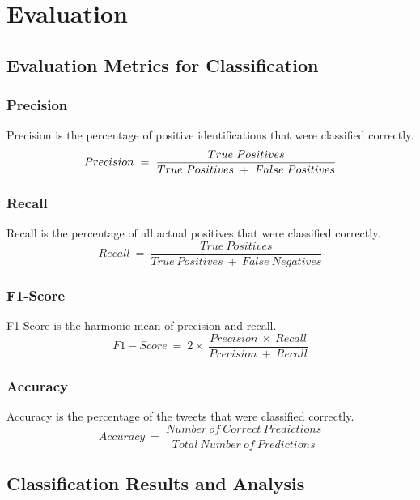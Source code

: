 \section{Evaluation}

\subsection{Evaluation Metrics for Classification}

\subsubsection{Precision}
Precision is the percentage of positive identifications that were classified correctly.\newline
\begin{equation}
\small
    Precision\ =\ \frac{True\ Positives}{True\ Positives\ +\ False\ Positives}
\end{equation}
\normalsize
\subsubsection{Recall}
Recall is the percentage of all actual positives that were classified correctly.
\small
\begin{equation}
    Recall\ =\ \frac{True\ Positives}{True\ Positives\ +\ False\ Negatives}
\end{equation}
\normalsize
\subsubsection{F1-Score}
F1-Score is the harmonic mean of precision and recall.
\small
\begin{equation}
    F1-Score\ =\ 2 \times\ \frac{Precision\ \times\ Recall}{Precision\ +\ Recall}
\end{equation}
\normalsize
\subsubsection{Accuracy}
Accuracy is the percentage of the tweets that were classified correctly.
\small
\begin{equation}
    Accuracy\ =\ \frac{Number\ of\ Correct\ Predictions}{Total\ Number\ of\ Predictions}
\end{equation}
\normalsize

\subsection{Classification Results and Analysis}

